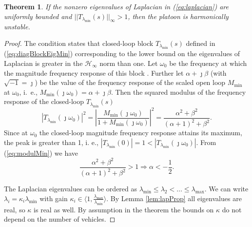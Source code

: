 \documentclass[technote, 10pt, twoside]{IEEEtran}
\newcommand{\lapDom}{s}
\newcommand{\openLoop}{M}
\newcommand{\openLoopGain}{\openLoop_{\min}}
\newcommand{\wn}{i}
\newcommand{\spatEig}{\lambda} \newcommand{\spatEigWn}{\lambda_\wn}
\newcommand{\spatEigMin}{\spatEig_{\min}}
\newcommand{\spatEigMax}{\spatEig_{\max}}
\newcommand{\diagTransBlockEig}{T}
\newcommand{\diagTransBlockEigMin}{\diagTransBlockEig_{\spatEig_{\min}}}
\theoremstyle{plain}
\newtheorem{theorem}{Theorem}
\theoremstyle{definition}
\theoremstyle{assump}
\begin{document}
\begin{theorem}
If the nonzero eigenvalues of Laplacian in (\ref{eq:laplacian}) are
uniformly bounded and $||
\diagTransBlockEigMin(s) ||_{\infty} > 1$, then the platoon is harmonically
unstable.
\label{thm:stringInstab}
\end{theorem}
 \begin{proof} The condition states that closed-loop block
 $\diagTransBlockEigMin(s)$ defined in (\ref{eq:diagBlockEigMin}) corresponding 
 to the lower bound on the eigenvalues of Laplacian is greater in the
 $\mathcal{H}_{\infty}$ norm than one. Let $\omega_0$ be the frequency at
 which the magnitude frequency response of this block . Further let $\alpha+\jmath \beta$
 (with $\sqrt{-1}=\jmath$) be the value of the frequency response of the scaled
 open loop $\openLoopGain$ at $\omega_0$, i.~e., $\openLoopGain(\jmath
 \omega_0)= \alpha + \jmath \beta$. Then the squared modulus of the frequency
 response of the closed-loop $\diagTransBlockEigMin(\lapDom)$ 
\begin{equation}
	|\diagTransBlockEigMin(\jmath \omega_0)|^2 = \left |
	\frac{{\openLoopGain}(\jmath \omega_0)}{1+{\openLoopGain}(\jmath
	\omega_0)} \right |^2=\frac{\alpha^2 + \beta^2}{(\alpha+1)^2 + \beta^2}.
	\label{eq:modulMin}
\end{equation}
Since at $\omega_0$ the closed-loop magnitude frequency response attains its
maximum, the peak is greater than 1, i. e., $|\diagTransBlockEigMin(0)|=1 <
|\diagTransBlockEigMin(\jmath \omega_0)|$. From (\ref{eq:modulMin}) we have
\begin{equation}
	\frac{\alpha^2 +\beta^2}{(\alpha+1)^2 + \beta^2} > 1 \Rightarrow \alpha <
	-\frac{1}{2}.
\end{equation} 
	
The Laplacian eigenvalues can be ordered as $\spatEigMin \leq \spatEig_2 < \ldots \leq \spatEigMax$. We can write $\spatEigWn = \kappa_\wn \spatEigMin$ with gain $\kappa_\wn \in \langle 1,\frac{\spatEigMax}{\spatEigMin} \rangle$. By Lemma \ref{lem:lapProp} all eigenvalues are real, so $\kappa$ is real as well.
By assumption in the theorem the bounds on $\kappa$ do not depend on the number
of vehicles.


\end{proof}
\end{document}
